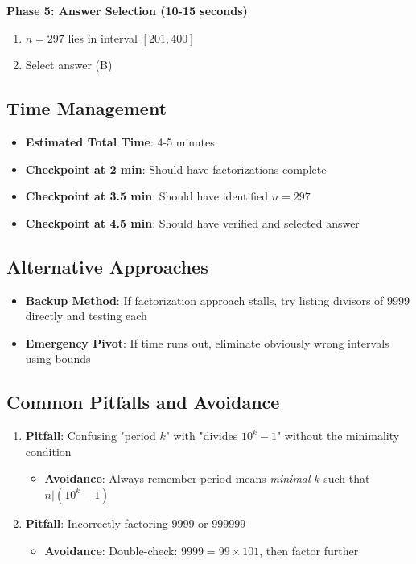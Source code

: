 \documentclass[11pt]{article}
\begin{document}
\begin{roadmapbox}
\textbf{Phase 5: Answer Selection (10-15 seconds)}
\begin{enumerate}[leftmargin=*]
    \item $n = 297$ lies in interval $[201, 400]$
    \item Select answer (B)
\end{enumerate}

\subsection*{Time Management}
\begin{itemize}[leftmargin=*]
    \item \textbf{Estimated Total Time}: 4-5 minutes
    \item \textbf{Checkpoint at 2 min}: Should have factorizations complete
    \item \textbf{Checkpoint at 3.5 min}: Should have identified $n = 297$
    \item \textbf{Checkpoint at 4.5 min}: Should have verified and selected answer
\end{itemize}

\subsection*{Alternative Approaches}
\begin{itemize}[leftmargin=*]
    \item \textbf{Backup Method}: If factorization approach stalls, try listing divisors of $9999$ directly and testing each
    \item \textbf{Emergency Pivot}: If time runs out, eliminate obviously wrong intervals using bounds
\end{itemize}

\subsection*{Common Pitfalls and Avoidance}
\begin{enumerate}[leftmargin=*]
    \item \textbf{Pitfall}: Confusing "period $k$" with "divides $10^k - 1$" without the minimality condition
    \begin{itemize}
        \item \textbf{Avoidance}: Always remember period means \textit{minimal} $k$ such that $n | (10^k - 1)$
    \end{itemize}
    
    \item \textbf{Pitfall}: Incorrectly factoring $9999$ or $999999$
    \begin{itemize}
        \item \textbf{Avoidance}: Double-check: $9999 = 99 \times 101$, then factor further
    \end{itemize}
    

\end{enumerate}
\end{roadmapbox}
\end{document}

